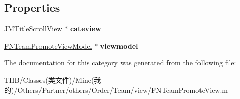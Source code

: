 \subsection*{Properties}
\begin{DoxyCompactItemize}
\item 
\mbox{\label{category_f_n_team_promote_view_07_08_a2c0aa98a754d7470ed1b5526eb8b696f}} 
\mbox{\hyperlink{interface_j_m_title_scroll_view}{J\+M\+Title\+Scroll\+View}} $\ast$ {\bfseries cateview}
\item 
\mbox{\label{category_f_n_team_promote_view_07_08_a89b3739337eaa565150b524199c2b107}} 
\mbox{\hyperlink{interface_f_n_team_promote_view_model}{F\+N\+Team\+Promote\+View\+Model}} $\ast$ {\bfseries viewmodel}
\end{DoxyCompactItemize}


The documentation for this category was generated from the following file\+:\begin{DoxyCompactItemize}
\item 
T\+H\+B/\+Classes(类文件)/\+Mine(我的)/\+Others/\+Partner/others/\+Order/\+Team/view/F\+N\+Team\+Promote\+View.\+m\end{DoxyCompactItemize}
